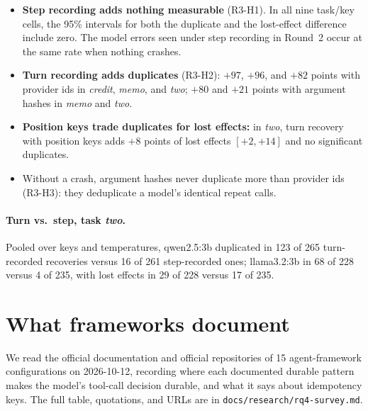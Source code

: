 \documentclass[11pt]{article}
\begin{document}
\begin{itemize}
  \item \textbf{Step recording adds nothing measurable} (R3-H1). In all nine
        task/key cells, the 95\% intervals for both the duplicate and the
        lost-effect difference include zero. The model errors seen under
        step recording in Round~2 occur at the same rate when nothing
        crashes.
  \item \textbf{Turn recording adds duplicates} (R3-H2): $+97$, $+96$, and
        $+82$ points with provider ids in \emph{credit}, \emph{memo}, and
        \emph{two}; $+80$ and $+21$ points with argument hashes in
        \emph{memo} and \emph{two}.
  \item \textbf{Position keys trade duplicates for lost effects:} in
        \emph{two}, turn recovery with position keys adds $+8$ points of lost
        effects $[+2, +14]$ and no significant duplicates.
  \item Without a crash, argument hashes never duplicate more than provider
        ids (R3-H3): they deduplicate a model's identical repeat calls.
\end{itemize}

\paragraph{Turn vs.\ step, task \emph{two}.} Pooled over keys and
temperatures, qwen2.5:3b duplicated in 123 of 265 turn-recorded recoveries
versus 16 of 261 step-recorded ones; llama3.2:3b in 68 of 228 versus 4 of
235, with lost effects in 29 of 228 versus 17 of 235.

\section{What frameworks document}
\label{sec:survey}
We read the official documentation and official repositories of 15
agent-framework configurations on 2026-10-12, recording where each documented
durable pattern makes the model's tool-call decision durable, and what it
says about idempotency keys. The full table, quotations, and URLs are in
\texttt{docs/research/rq4-survey.md}.
\end{document}
